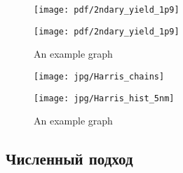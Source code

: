 \begin{figure}
	\begin{minipage}{0.5\textwidth}
		\raggedright
		\texttt{[image: pdf/2ndary\_yield\_1p9]}
	\end{minipage}%
	\begin{minipage}{0.5\textwidth}
		\raggedleft
		\texttt{[image: pdf/2ndary\_yield\_1p9]}
	\end{minipage}%
	\caption{An example graph}
\end{figure}


\begin{figure}
	\begin{minipage}{0.5\textwidth}
		\raggedright
		\texttt{[image: jpg/Harris\_chains]}
	\end{minipage}%
	\begin{minipage}{0.5\textwidth}
		\raggedleft
		\texttt{[image: jpg/Harris\_hist\_5nm]}
	\end{minipage}%
	\caption{An example graph}
\end{figure}


\subsection{Численный подход}







